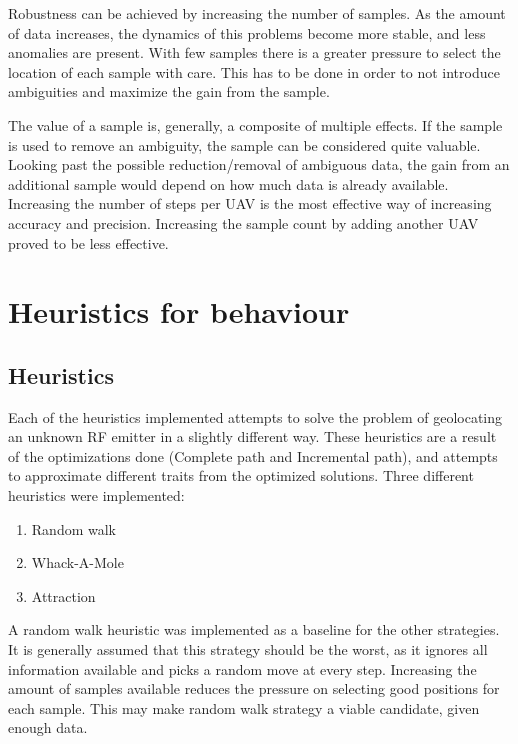 \documentclass[10pt,a4paper]{book}
\begin{document}
Robustness can be achieved by increasing the number of samples. As the amount of data increases, the dynamics of this problems become more stable, and less anomalies are present. With few samples there is a greater pressure to select the location of each sample with care. This has to be done in order to not introduce ambiguities and maximize the gain from the sample. 

\newpage

The value of a sample is, generally, a composite of multiple effects. If the sample is used to remove an ambiguity, the sample can be considered quite valuable. Looking past the possible reduction/removal of ambiguous data, the gain from an additional sample would depend on how much data is already available. Increasing the number of steps per \gls{UAV} is the most effective way of increasing accuracy and precision. Increasing the sample count by adding another \gls{UAV} proved to be less effective. 


\newpage

\section{Heuristics for  behaviour}
\label{RA_HEUR}



\subsection{Heuristics}
\label{RA_HEUR_HEUR}

Each of the heuristics implemented attempts to solve the problem of geolocating an unknown \gls{RF} emitter in a slightly different way. These heuristics are a result of the optimizations done (Complete path and Incremental path), and attempts to approximate different traits from the optimized solutions. Three different heuristics were implemented:

\begin{enumerate}
\item Random walk
\item Whack-A-Mole
\item Attraction 
\end{enumerate}



A random walk heuristic was implemented as a baseline for the other strategies. It is generally assumed that this strategy should be the worst, as it ignores all information available and picks a random move at every step. Increasing the amount of samples available reduces the pressure on selecting good positions for each sample. This may make random walk strategy a viable candidate, given enough data. 
\end{document}
